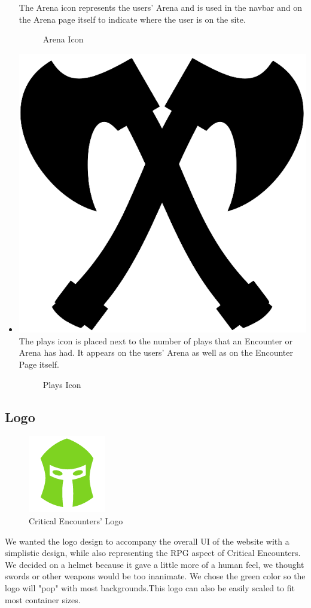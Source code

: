 \documentclass[12pt,a4paper]{report}
\begin{document}
\begin{itemize}
		The Arena icon represents the users' Arena and is used in the navbar and on the Arena page itself to indicate where the user is on the site.
		\begin{figure}
			\caption{Arena Icon}
			\label{fig: Arena Icon}
		\end{figure}
		\item \includegraphics[scale=.03]{plays_icon}
		The plays icon is placed next to the number of plays that an Encounter or Arena has had. It appears on the users' Arena as well as on the Encounter Page itself.
		\begin{figure}
			\caption{Plays Icon}
			\label{fig: Plays Icon}
		\end{figure}
	\end{itemize}
	\subsection {Logo}
	\begin{figure}
		\includegraphics[scale=.5]{logo-large}
		\caption{Critical Encounters' Logo}
		\label{fig: Critical Encounters' Logo}
	\end{figure}
	We wanted the logo design to accompany the overall UI of the website with a simplistic design, while also representing the RPG aspect of Critical Encounters. We decided on a helmet because it gave a little more of a human feel, we thought swords or other weapons would be too inanimate. We chose the green color so the logo will "pop" with most backgrounds.This logo can also be easily scaled to fit most container sizes.
\newpage
\end{document}
